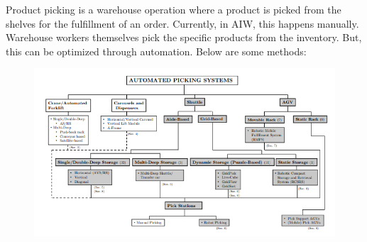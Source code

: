 \documentclass{report}
\begin{document}
Product picking is a warehouse operation where a product is picked from the shelves for the fulfillment of an order. Currently, in AIW, this happens manually. Warehouse workers themselves pick the specific products from the inventory. But, this can be optimized through automation. Below are some methods:

 \begin{figure}[H]
    
    \centering
    \includegraphics[scale=0.6]{picking.png}
    \caption{}
    
    \end{figure}
\end{document}
